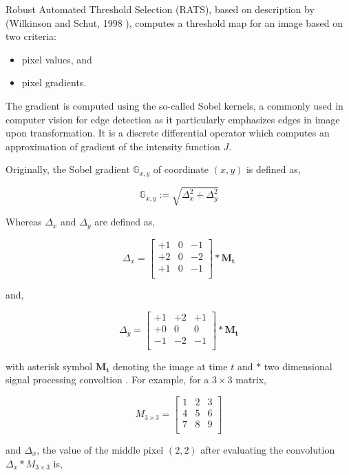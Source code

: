 \documentclass[pdftex,12pt,a4paper]{report}
\begin{document}
Robust Automated Threshold Selection (RATS), based on description by (Wilkinson and Schut, 1998 \cite{wilkinson1998digital}), computes a threshold map for an image based on two criteria:

\begin{itemize}
\item pixel values, and
\item pixel gradients.
\end{itemize}

The gradient is computed using the so-called Sobel kernels\cite{sobel1990isotropic}, a commonly used in computer vision for edge detection as it particularly emphasizes edges in image upon transformation. It is a discrete differential operator which computes an approximation of gradient of the intensity function $J$.

Originally, the Sobel gradient $\mathbb{G}_{x, y}$ of coordinate $(x, y)$ is defined as,

$$
\mathbb{G}_{x, y} := \sqrt{\Delta_x^2 + \Delta_y^2}
$$

Whereas $\Delta_x$ and $\Delta_y$ are defined as,

\[
\Delta_x = 
\begin{bmatrix}
+1 & 0 & -1 \\
+2 & 0 & -2 \\
+1 & 0 & -1 \\
\end{bmatrix}
*
\mathbf{M_t}
\]

and,

\[
\Delta_y = 
\begin{bmatrix}
+1 & +2 & +1 \\
+0 & 0 & 0 \\
-1 & -2 & -1 \\
\end{bmatrix}
*
\mathbf{M_t}
\]

with asterisk symbol $\mathbf{M_t}$ denoting the image at time $t$ and $*$ two dimensional signal processing convoltion \cite{smith1997scientist}. For example, for a $3 \times 3$ matrix,

\[
M_{3 \times 3} = 
\begin{bmatrix}
1 & 2 & 3 \\
4 & 5 & 6 \\
7 & 8 & 9 \\
\end{bmatrix}
\]

and $\Delta_x$, the value of the middle pixel $(2, 2)$ after evaluating the convolution $\Delta_x * M_{3 \times 3}$ is,
\end{document}
